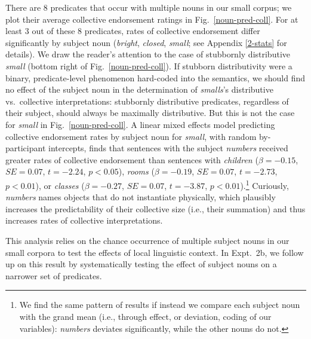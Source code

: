 \documentclass[preprint,12pt,authoryear,titlepage]{elsarticle}
\newcommand{\ndg}[1]{\textcolor{Green}{[ndg: #1]}}
\newcommand{\gcs}[1]{\textcolor{blue}{[gcs: #1]}}
\begin{document}
There are 8 predicates that occur with multiple nouns in our small corpus; we plot their average collective endorsement ratings in Fig.~\ref{noun-pred-coll}.
%
%
For at least 3 out of these 8 predicates, rates of collective endorsement differ significantly by subject noun (\emph{bright}, \emph{closed}, \emph{small}; see Appendix \ref{2-stats} for details). We draw the reader's attention to the case of stubbornly distributive \emph{small} (bottom right of Fig.~\ref{noun-pred-coll}). 
If stubborn distributivity were a binary, predicate-level phenomenon hard-coded into the semantics, we should find no effect of the subject noun in the determination of \emph{smalls}'s distributive vs.~collective interpretations: stubbornly distributive predicates, regardless of their subject, should always be maximally distributive. But this is not the case for \emph{small} in Fig.~\ref{noun-pred-coll}. 
A linear mixed effects model predicting collective endorsement rates by subject noun for \emph{small}, with random by-participant intercepts, finds that sentences with the subject \emph{numbers} received greater rates of collective endorsement than sentences with \emph{children} ($\beta=-0.15$, $SE=0.07$, $t=-2.24$, $p<0.05$), \emph{rooms} ($\beta=-0.19$, $SE=0.07$, $t=-2.73$, $p<0.01$), or \emph{classes} ($\beta=-0.27$, $SE=0.07$, $t=-3.87$, $p<0.01$).\footnote{We find the same pattern of results if instead we compare each subject noun with the grand mean (i.e., through effect, or deviation, coding of our variables): \emph{numbers} deviates significantly, while the other nouns do not.} Curiously, \emph{numbers} names objects that do not instantiate physically, which plausibly increases the predictability of their collective size (i.e., their summation) and thus increases rates of collective interpretations.

This analysis relies on the chance occurrence of multiple subject nouns in our small corpora to test the effects of local linguistic context. In Expt.~2b, we follow up on this result by systematically testing the effect of subject nouns on a narrower set of predicates.
\end{document}
